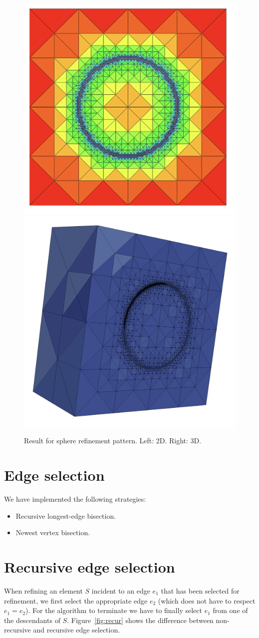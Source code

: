 \documentclass{article}
\begin{document}
\begin{figure} \centering \footnotesize
	\includegraphics[width=0.40\linewidth]{figures/2d_sphere} \hfill
	\includegraphics[width=0.40\linewidth]{figures/3d_sphere} 
	\caption{Result for sphere refinement pattern. Left: 2D. Right: 3D.}
	\label{fig:sphere}
\end{figure}

\section{Edge selection}

We have implemented the following strategies:

\begin{itemize}
	\item Recursive longest-edge bisection.
	\item Newest vertex bisection.
\end{itemize}

\section{Recursive edge selection}

When refining an element $S$ incident to an edge $e_1$ that has been selected for refinement, we first select the appropriate edge $e_2$ (which does not have to respect $e_1 = e_2$).
For the algorithm to terminate we have to finally select $e_1$ from one of the descendants of $S$.
Figure~\ref{fig:recur} shows the difference between non-recursive and recursive edge selection.
\end{document}
